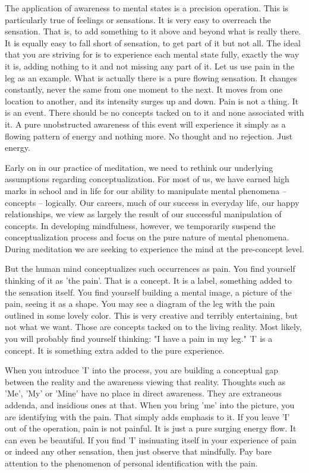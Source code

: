 The application of awareness to mental states is a precision operation. This is
particularly true of feelings or sensations. It is very easy to overreach the
sensation. That is, to add something to it above and beyond what is really
there. It is equally easy to fall short of sensation, to get part of it but not
all. The ideal that you are striving for is to experience each mental state
fully, exactly the way it is, adding nothing to it and not missing any part of
it. Let us use pain in the leg as an example. What is actually there is a pure
flowing sensation. It changes constantly, never the same from one moment to the
next. It moves from one location to another, and its intensity surges up and
down. Pain is not a thing. It is an event. There should be no concepts tacked on
to it and none associated with it. A pure unobstructed awareness of this event
will experience it simply as a flowing pattern of energy and nothing more. No
thought and no rejection. Just energy.

Early on in our practice of meditation, we need to rethink our underlying
assumptions regarding conceptualization. For most of us, we have earned high
marks in school and in life for our ability to manipulate mental phenomena --
concepts -- logically. Our careers, much of our success in everyday life, our
happy relationships, we view as largely the result of our successful
manipulation of concepts. In developing mindfulness, however, we temporarily
suspend the conceptualization process and focus on the pure nature of mental
phenomena. During meditation we are seeking to experience the mind at the
pre-concept level.

But the human mind conceptualizes such occurrences as pain. You find yourself
thinking of it as 'the pain'. That is a concept. It is a label, something added
to the sensation itself. You find yourself building a mental image, a picture of
the pain, seeing it as a shape. You may see a diagram of the leg with the pain
outlined in some lovely color. This is very creative and terribly entertaining,
but not what we want. Those are concepts tacked on to the living reality. Most
likely, you will probably find yourself thinking: "I have a pain in my leg." 'I'
is a concept. It is something extra added to the pure experience.

When you introduce 'I' into the process, you are building a conceptual gap
between the reality and the awareness viewing that reality. Thoughts such as
'Me', 'My' or 'Mine' have no place in direct awareness. They are extraneous
addenda, and insidious ones at that. When you bring 'me' into the picture, you
are identifying with the pain. That simply adds emphasis to it. If you leave 'I'
out of the operation, pain is not painful. It is just a pure surging energy
flow. It can even be beautiful. If you find 'I' insinuating itself in your
experience of pain or indeed any other sensation, then just observe that
mindfully. Pay bare attention to the phenomenon of personal identification with
the pain.

